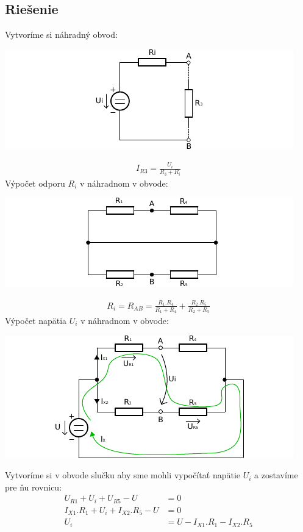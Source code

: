 \subsection{Riešenie}
Vytvoríme si náhradný obvod: 
\begin{center}
  \includegraphics[width=0.8\columnwidth,keepaspectratio]{res/u2o2}
\end{center}
\begin{align*}
I_{R3} = \frac{U_{i}}{R_{3} + R_{i}}
\end{align*}
Výpočet odporu $R_{i}$ v náhradnom v obvode:
\begin{center}
  \includegraphics[width=0.8\columnwidth,keepaspectratio]{res/u2o3}
\end{center}
\begin{align*}
R_{i} = R_{AB} = \frac{R_{1} . R_{4}}{R_{1} + R_{4}} + \frac{R_{2} . R_{5}}{R_{2} + R_{5}}
\end{align*}
Výpočet napätia $U_{i}$ v náhradnom v obvode:
\begin{center}
  \includegraphics[width=0.8\columnwidth,keepaspectratio]{res/u2o4}
\end{center}
Vytvoríme si v obvode slučku aby sme mohli vypočítať napätie $U_{i}$ a zostavíme pre ňu rovnicu:
\begin{align*}
  U_{R1} + U_{i} + U_{R5} - U &= 0 \\
  I_{X1}.R_{1} + U_{i} + I_{X2}.R_{5} - U &= 0 \\
   U_{i} &=U -I_{X1}.R_{1}- I_{X2}.R_{5}
\end{align*}
